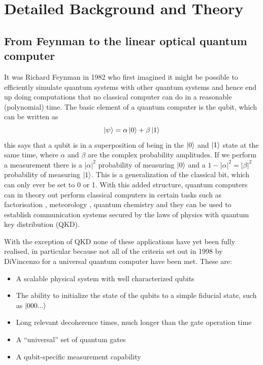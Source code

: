 \newpage
\section{Detailed Background and Theory}
\subsection{From Feynman to the linear optical quantum computer}
It was Richard Feynman in 1982\cite{feynman_simulating_1982} who first imagined it might be possible to efficiently simulate quantum systems with other quantum systems and hence end up doing computations that no classical computer can do in a reasonable (polynomial) time. The basic element of a quantum computer is the qubit, which can be written as
\begin{equation}
\ket{\psi}=\alpha \ket{0}+\beta\ket{1}
\end{equation}
this says that a qubit is in a superposition of being in the $\ket{0}$ and $\ket{1}$ state at the same time, where $\alpha$ and $\beta$ are the complex probability amplitudes. If we perform a measurement there is a $|\alpha|^2$ probability of measuring $\ket{0}$ and a $1-|\alpha|^2=|\beta|^2$ probability of measuring $\ket{1}$. This is a generalization of the classical bit, which can only ever be set to 0 or 1. With this added structure, quantum computers can in theory out perform classical computers in certain tasks such as factorisation \cite{shor_polynomial-time_1995}, meteorology \cite{toth_quantum_2014}, quantum chemistry\cite{georgescu_quantum_2014} and they can be used to establish communication systems secured by the laws of physics with quantum key distribution (QKD)\cite{zhang_reference-frame-independent_2014}.

With the exception of QKD none of these applications have yet been fully realised, in particular because not all of the criteria  \cite{divincenzo_quantum_1998} set out in 1998 by DiVincenzo for a universal quantum  computer have been met. These are:
\begin{itemize}
	\item A scalable physical system with well characterized
qubits
	\item The ability to initialize the state of the qubits to a
simple fiducial state, such as $\ket{000...}$
	\item Long relevant decoherence times, much longer than
the gate operation time
	\item A “universal” set of quantum gates
	\item A qubit-specific measurement capability
\end{itemize}

